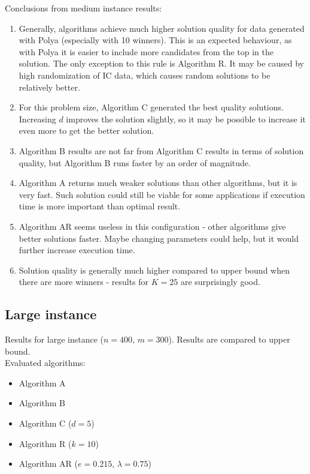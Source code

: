 Conclusions from medium instance results:
\begin{enumerate}
	\item Generally, algorithms achieve much higher solution quality for data generated with Polya (especially with 10 winners). This is an expected behaviour, as with Polya it is easier to include more candidates from the top in the solution. The only exception to this rule is Algorithm R. It may be caused by high randomization of IC data, which causes random solutions to be relatively better.
	\item For this problem size, Algorithm C generated the best quality solutions. Increasing $d$ improves the solution slightly, so it may be possible to increase it even more to get the better solution.
	\item Algorithm B results are not far from Algorithm C results in terms of solution quality, but Algorithm B runs faster by an order of magnitude.
	\item Algorithm A returns much weaker solutions than other algorithms, but it is very fast. Such solution could still be viable for some applications if execution time is more important than optimal result.
	\item Algorithm AR seems useless in this configuration - other algorithms give better solutions faster. Maybe changing parameters could help, but it would further increase execution time.
	\item Solution quality is generally much higher compared to upper bound when there are more winners - results for $K = 25$ are surprisingly good.
\end{enumerate}

\subsection{Large instance}

Results for large instance ($n = 400$, $m = 300$). Results are compared to upper bound.
\\

Evaluated algorithms:
\begin{itemize}
	\item Algorithm A
	\item Algorithm B
	\item Algorithm C ($d = 5$)
	\item Algorithm R ($k = 10$)
	\item Algorithm AR ($e = 0.215$, $\lambda = 0.75$)
\end{itemize}

